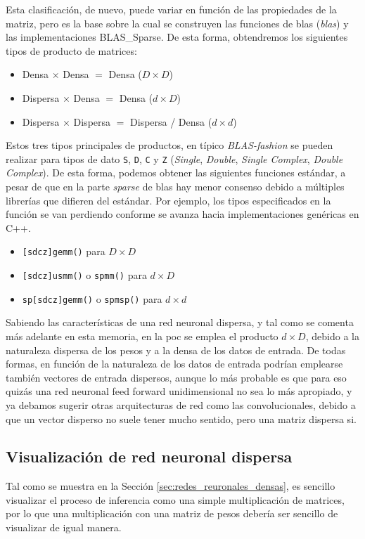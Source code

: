 Esta clasificación, de nuevo, puede variar en función de las propiedades de la matriz, pero es la base sobre la cual se construyen las funciones de \acrshort{blas} (\textit{\acrlong{blas}}) y las implementaciones BLAS\_Sparse. De esta forma, obtendremos los siguientes tipos de producto de matrices:

\begin{itemize}
    \item Densa $\times$ Densa $=$ Densa ($D\times D$)
    \item Dispersa $\times$ Densa $=$ Densa ($d\times D$)
    \item Dispersa $\times$ Dispersa $=$ Dispersa / Densa ($d\times d$)
\end{itemize}

Estos tres tipos principales de productos, en típico \textit{BLAS-fashion} se pueden realizar para tipos de dato \texttt{S}, \texttt{D}, \texttt{C} y \texttt{Z} (\textit{Single}, \textit{Double}, \textit{Single Complex}, \textit{Double Complex}).
De esta forma, podemos obtener las siguientes funciones estándar, a pesar de que en la parte \textit{sparse} de \acrshort{blas} hay menor consenso debido a múltiples librerías que difieren del estándar. Por ejemplo, los tipos especificados en la función se van perdiendo conforme se avanza hacia implementaciones genéricas en C++.

\begin{itemize}
    \item \texttt{[sdcz]gemm()} para $D\times D$
    \item \texttt{[sdcz]usmm()} o \texttt{spmm()} para $d\times D$
    \item \texttt{sp[sdcz]gemm()} o \texttt{spmsp()} para $d\times d$
\end{itemize}

Sabiendo las características de una red neuronal dispersa, y tal como se comenta más adelante en esta memoria, en la \acrshort{poc} se emplea el producto $d\times D$, debido a la naturaleza dispersa de los pesos y a la densa de los datos de entrada. De todas formas, en función de la naturaleza de los datos de entrada podrían emplearse también vectores de entrada dispersos, aunque lo más probable es que para eso quizás una red neuronal feed forward unidimensional no sea lo más apropiado, y ya debamos sugerir otras arquitecturas de red como las convolucionales, debido a que un vector disperso no suele tener mucho sentido, pero una matriz dispersa si.

\subsection{Visualización de red neuronal dispersa}
\label{ssec:visualizacion_nn_dispersa}
Tal como se muestra en la Sección \ref{sec:redes_reuronales_densas}, es sencillo visualizar el proceso de inferencia como una simple multiplicación de matrices, por lo que una multiplicación con una matriz de pesos debería ser sencillo de visualizar de igual manera.

